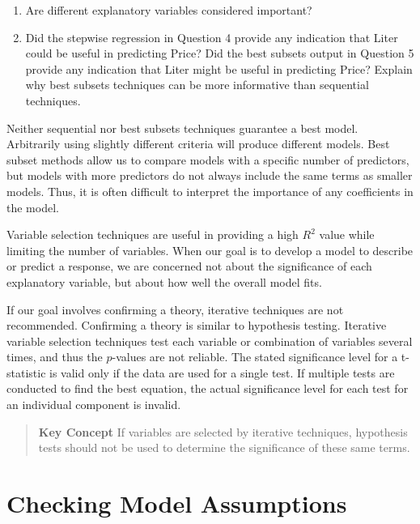 \documentclass[
]{report}
\begin{document}
\begin{enumerate}
\def\labelenumi{\alph{enumi}.}
\item
  Are different explanatory variables considered important?
\item
  Did the stepwise regression in Question 4 provide any indication that Liter could be useful in predicting Price? Did the best subsets output in Question 5 provide any indication that Liter might be useful in predicting Price? Explain why best subsets techniques can be more informative than sequential techniques.
\end{enumerate}

Neither sequential nor best subsets techniques guarantee a best model. Arbitrarily using slightly different criteria will produce different models. Best subset methods allow us to compare models with a specific number of predictors, but models with more predictors do not always include the same terms as smaller models. Thus, it is often difficult to interpret the importance of any coefficients in the model.

Variable selection techniques are useful in providing a high \(R^2\) value while limiting the number of variables. When our goal is to develop a model to describe or predict a response, we are concerned not about the significance of each explanatory variable, but about how well the overall model fits.

If our goal involves confirming a theory, iterative techniques are not recommended. Confirming a theory is similar to hypothesis testing. Iterative variable selection techniques test each variable or combination of variables several times, and thus the \(p\)-values are not reliable. The stated significance level for a t-statistic is valid only if the data are used for a single test. If multiple tests are conducted to find the best equation, the actual significance level for each test for an individual component is invalid.

\begin{quote}
\textbf{Key Concept}
If variables are selected by iterative techniques, hypothesis tests should not be used to determine the significance of these same terms.
\end{quote}

\section{\texorpdfstring{\textbf{Checking Model Assumptions}}{Checking Model Assumptions}}\label{checking-model-assumptions-1}
\end{document}
